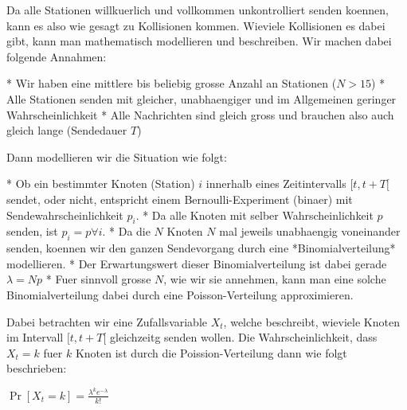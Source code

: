 Da alle Stationen willkuerlich und vollkommen unkontrolliert senden koennen,
kann es also wie gesagt zu Kollisionen kommen. Wieviele Kollisionen es dabei
gibt, kann man mathematisch modellieren und beschreiben. Wir machen dabei
folgende Annahmen:

* Wir haben eine mittlere bis beliebig grosse Anzahl an Stationen ($N > 15$)
* Alle Stationen senden mit gleicher, unabhaengiger und im Allgemeinen geringer
  Wahrscheinlichkeit
* Alle Nachrichten sind gleich gross und brauchen also auch gleich lange
  (Sendedauer $T$)

Dann modellieren wir die Situation wie folgt:

* Ob ein bestimmter Knoten (Station) $i$ innerhalb eines Zeitintervalls
  $[t, t + T[$ sendet, oder nicht, entspricht einem Bernoulli-Experiment (binaer) mit Sendewahrscheinlichkeit $p_i$.
* Da alle Knoten mit selber Wahrscheinlichkeit $p$ senden, ist $p_i = p \forall i$.
* Da die $N$ Knoten $N$ mal jeweils unabhaengig voneinander senden, koennen wir den ganzen Sendevorgang durch eine *Binomialverteilung* modellieren.
* Der Erwartungswert dieser Binomialverteilung ist dabei gerade $\lambda = Np$
* Fuer sinnvoll grosse $N$, wie wir sie annehmen, kann man eine solche Binomialverteilung dabei durch eine Poisson-Verteilung approximieren.

Dabei betrachten wir eine Zufallsvariable $X_t$, welche beschreibt, wieviele Knoten im Intervall $[t, t + T[$ gleichzeitg senden wollen. Die Wahrscheinlichkeit, dass $X_t = k$ fuer $k$ Knoten ist durch die Poission-Verteilung dann wie folgt beschrieben:

$\Pr[X_t = k] = \frac{\lambda^k e^{-\lambda}}{k!}$

